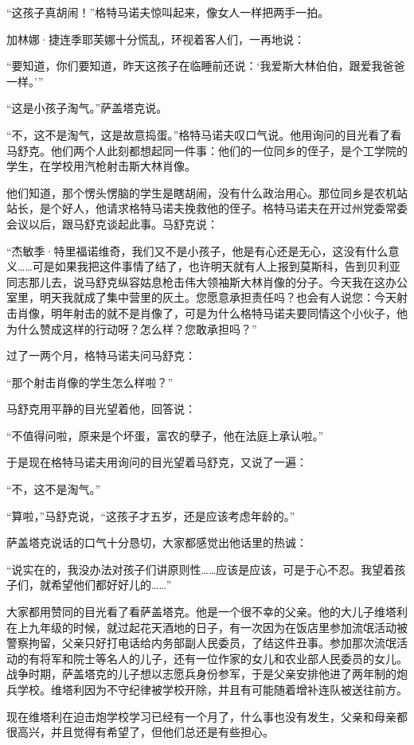 “这孩子真胡闹！”格特马诺夫惊叫起来，像女人一样把两手一拍。

加林娜·捷连季耶芙娜十分慌乱，环视着客人们，一再地说：

“要知道，你们要知道，昨天这孩子在临睡前还说：‘我爱斯大林伯伯，跟爱我爸爸一样。’”

“这是小孩子淘气。”萨盖塔克说。

“不，这不是淘气，这是故意捣蛋。”格特马诺夫叹口气说。他用询问的目光看了看马舒克。他们两个人此刻都想起同一件事：他们的一位同乡的侄子，是个工学院的学生，在学校用汽枪射击斯大林肖像。

他们知道，那个愣头愣脑的学生是瞎胡闹，没有什么政治用心。那位同乡是农机站站长，是个好人，他请求格特马诺夫挽救他的侄子。格特马诺夫在开过州党委常委会议以后，跟马舒克谈起此事。马舒克说：

“杰敏季·特里福诺维奇，我们又不是小孩子，他是有心还是无心，这没有什么意义……可是如果我把这件事情了结了，也许明天就有人上报到莫斯科，告到贝利亚同志那儿去，说马舒克纵容姑息枪击伟大领袖斯大林肖像的分子。今天我在这办公室里，明天我就成了集中营里的灰土。您愿意承担责任吗？也会有人说您：今天射击肖像，明年射击的就不是肖像了，可是为什么格特马诺夫要同情这个小伙子，他为什么赞成这样的行动呀？怎么样？您敢承担吗？”

过了一两个月，格特马诺夫问马舒克：

“那个射击肖像的学生怎么样啦？”

马舒克用平静的目光望着他，回答说：

“不值得问啦，原来是个坏蛋，富农的孽子，他在法庭上承认啦。”

于是现在格特马诺夫用询问的目光望着马舒克，又说了一遍：

“不，这不是淘气。”

“算啦，”马舒克说，“这孩子才五岁，还是应该考虑年龄的。”

萨盖塔克说话的口气十分恳切，大家都感觉出他话里的热诚：

“说实在的，我没办法对孩子们讲原则性……应该是应该，可是于心不忍。我望着孩子们，就希望他们都好好儿的……”

大家都用赞同的目光看了看萨盖塔克。他是一个很不幸的父亲。他的大儿子维塔利在上九年级的时候，就过起花天酒地的日子，有一次因为在饭店里参加流氓活动被警察拘留，父亲只好打电话给内务部副人民委员，了结这件丑事。参加那次流氓活动的有将军和院士等名人的儿子，还有一位作家的女儿和农业部人民委员的女儿。战争时期，萨盖塔克的儿子想以志愿兵身份参军，于是父亲安排他进了两年制的炮兵学校。维塔利因为不守纪律被学校开除，并且有可能随着增补连队被送往前方。

现在维塔利在迫击炮学校学习已经有一个月了，什么事也没有发生，父亲和母亲都很高兴，并且觉得有希望了，但他们总还是有些担心。

